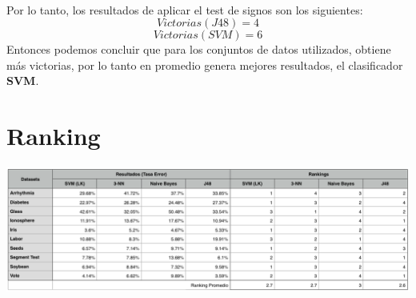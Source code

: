 \documentclass[10pt, a4paper,spanish]{article}
\begin{document}
		\paragraph{}
		Por lo tanto, los resultados de aplicar el test de signos son los siguientes:
		\[Victorias(J48) = 4\]
		\[Victorias(SVM) = 6\]
		Entonces podemos concluir que para los conjuntos de datos utilizados, obtiene más victorias, por lo tanto en promedio genera mejores resultados, el clasificador \textbf{SVM}.

	\section{Ranking}

        \paragraph{}
		\begin{center}
			\includegraphics[width=\textwidth]{ranking-table}
		\end{center}
\end{document}
